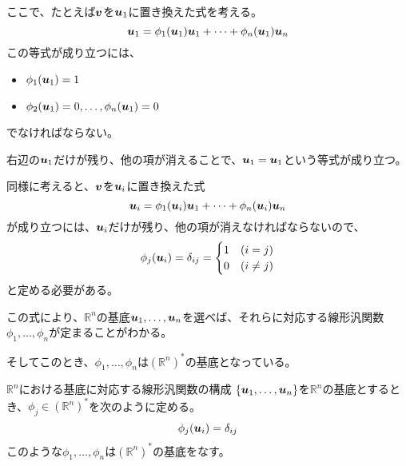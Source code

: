\documentclass[../../../topic_linear-algebra]{subfiles}
\begin{document}
\br

ここで、たとえば$\vb*{v}$を$\vb*{u}_1$に置き換えた式を考える。
\begin{equation*}
  \vb*{u}_1 = \phi_1(\vb*{u}_1) \vb*{u}_1 + \cdots + \phi_n(\vb*{u}_1) \vb*{u}_n
\end{equation*}
この等式が成り立つには、
\begin{itemize}
  \item $\phi_1(\vb*{u}_1) = 1$
  \item $\phi_2(\vb*{u}_1) = 0, \ldots, \phi_n(\vb*{u}_1) = 0$
\end{itemize}
でなければならない。

右辺の$\vb*{u}_1$だけが残り、他の項が消えることで、$\vb*{u}_1 = \vb*{u}_1$という等式が成り立つ。

\br

同様に考えると、$\vb*{v}$を$\vb*{u}_i$に置き換えた式
\begin{equation*}
  \vb*{u}_i = \phi_1(\vb*{u}_i) \vb*{u}_1 + \cdots + \phi_n(\vb*{u}_i) \vb*{u}_n
\end{equation*}
が成り立つには、$\vb*{u}_i$だけが残り、他の項が消えなければならないので、
\begin{equation*}
  \phi_j (\vb*{u}_i) = \delta_{ij} = \begin{cases}
    1 & (i = j) \\
    0 & (i \neq j)
  \end{cases}
\end{equation*}
と定める必要がある。

\br

この式により、$\mathbb{R}^n$の基底$\vb*{u}_1, \ldots, \vb*{u}_n$を選べば、それらに対応する線形汎関数$\phi_1, \ldots, \phi_n$が定まることがわかる。

そしてこのとき、$\phi_1, \ldots, \phi_n$は$(\mathbb{R}^n)^*$の基底となっている。

\begin{theorem}{$\mathbb{R}^n$における基底に対応する線形汎関数の構成}\label{thm:dual-basis-construction-Rn}
  $\{ \vb*{u}_1, \ldots, \vb*{u}_n \}$を$\mathbb{R}^n$の基底とするとき、$\phi_j \in (\mathbb{R}^n)^*$を次のように定める。
  \begin{equation*}
    \phi_j (\vb*{u}_i) = \delta_{ij}
  \end{equation*}
  このような$\phi_1, \ldots, \phi_n$は$(\mathbb{R}^n)^*$の基底をなす。
\end{theorem}
\end{document}
